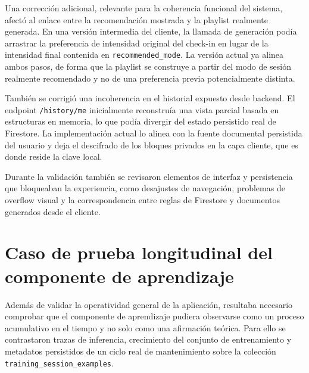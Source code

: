 Una corrección adicional, relevante para la coherencia funcional del sistema,
afectó al enlace entre la recomendación mostrada y la playlist realmente
generada. En una versión intermedia del cliente, la llamada de generación podía
arrastrar la preferencia de intensidad original del check-in en lugar de la
intensidad final contenida en \texttt{recommended\_mode}. La versión actual ya
alinea ambos pasos, de forma que la playlist se construye a partir del modo de
sesión realmente recomendado y no de una preferencia previa potencialmente
distinta.

También se corrigió una incoherencia en el historial expuesto desde backend.
El endpoint \texttt{/history/me} inicialmente reconstruía una vista parcial
basada en estructuras en memoria, lo que podía divergir del estado persistido
real de Firestore. La implementación actual lo alinea con la fuente documental
persistida del usuario y deja el descifrado de los bloques privados en la capa
cliente, que es donde reside la clave local.

Durante la validación también se revisaron elementos de interfaz y
persistencia que bloqueaban la experiencia, como desajustes de navegación,
problemas de overflow visual y la correspondencia entre reglas de
Firestore y documentos generados desde el cliente.

\section{Caso de prueba longitudinal del componente de aprendizaje}
\label{sec:caso_prueba_ml_evidencia}

Además de validar la operatividad general de la aplicación, resultaba
necesario comprobar que el componente de aprendizaje pudiera observarse como un
proceso acumulativo en el tiempo y no solo como una afirmación teórica. Para
ello se contrastaron trazas de inferencia, crecimiento del conjunto de
entrenamiento y metadatos persistidos de un ciclo real de mantenimiento sobre
la colección \texttt{training\_session\_examples}.

